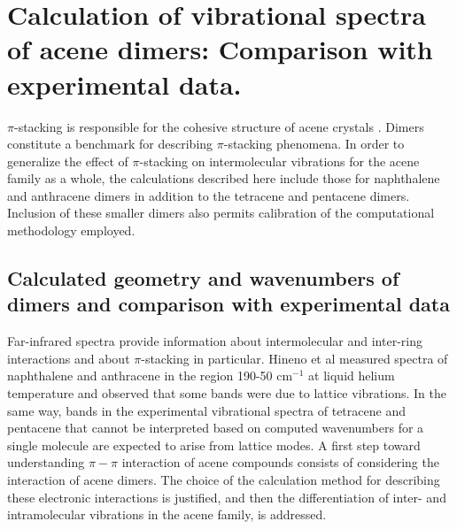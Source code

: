 \section{Calculation of vibrational spectra of acene dimers: Comparison with experimental data.}

$\pi$-stacking is responsible for the cohesive structure of acene crystals \cite{campbell1962crystal,mattheus2001polymorphism,brock1982temperature,facelli1993determination,brock1990temperature}. Dimers constitute a benchmark for describing $\pi$-stacking phenomena. In order to generalize the effect of $\pi$-stacking on intermolecular vibrations for the acene family as a whole, the calculations described here include those for naphthalene and anthracene dimers in addition to the tetracene and pentacene dimers. Inclusion of these smaller dimers also permits calibration of the computational methodology employed.  

\subsection{Calculated geometry and wavenumbers of dimers and comparison with experimental data}

Far-infrared spectra provide information about intermolecular and inter-ring interactions and about $\pi$-stacking in particular. Hineno et al \cite{hineno1975far}  measured spectra of naphthalene and anthracene in the region 190-50 cm$^{-1}$ at liquid helium temperature and observed that some bands were due to lattice vibrations. In the same way, bands in the experimental vibrational spectra of tetracene and pentacene that cannot be interpreted based on computed wavenumbers for a single molecule are expected to arise from lattice modes. A first step toward understanding $\pi -\pi$ interaction of acene compounds consists of considering the interaction of acene dimers. The choice of the calculation method for describing these electronic interactions is justified, and then the differentiation of inter- and intramolecular vibrations in the acene family, is addressed.\\

